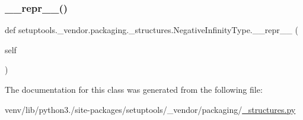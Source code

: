 \subsubsection{\texorpdfstring{\+\_\+\+\_\+repr\+\_\+\+\_\+()}{\_\_repr\_\_()}}
{\footnotesize\ttfamily def setuptools.\+\_\+vendor.\+packaging.\+\_\+structures.\+Negative\+Infinity\+Type.\+\_\+\+\_\+repr\+\_\+\+\_\+ (\begin{DoxyParamCaption}\item[{}]{self }\end{DoxyParamCaption})}



The documentation for this class was generated from the following file\+:\begin{DoxyCompactItemize}
\item 
venv/lib/python3./site-\/packages/setuptools/\+\_\+vendor/packaging/\hyperlink{setuptools_2__vendor_2packaging_2__structures_8py}{\+\_\+structures.\+py}\end{DoxyCompactItemize}
